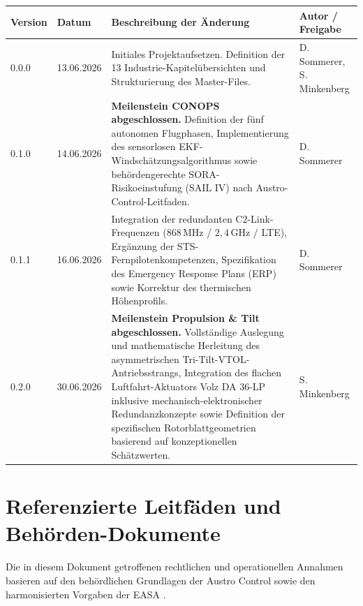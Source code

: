 \documentclass[12pt,a4paper,oneside]{report}
\begin{document}
\begin{table}[h!]
    \centering
    \small
    \begin{tabular}{p{1.8cm} p{2.2cm} p{7.5cm} p{3.0cm}}
        \toprule
        \textbf{Version} & \textbf{Datum} & \textbf{Beschreibung der Änderung} & \textbf{Autor / Freigabe} \\
        \midrule
        0.0.0 & 13.06.2026 & Initiales Projektaufsetzen. Definition der 13 Industrie-Kapitelübersichten und Strukturierung des Master-Files. & D. Sommerer, \newline S. Minkenberg \\
        \midrule
        0.1.0 & 14.06.2026 & \textbf{Meilenstein CONOPS abgeschlossen.} Definition der fünf autonomen Flugphasen, Implementierung des sensorlosen EKF-Windschätzungsalgorithmus sowie behördengerechte SORA-Risikoeinstufung (SAIL IV) nach Austro-Control-Leitfaden. & D. Sommerer \\
        \midrule
        0.1.1 & 16.06.2026 & Integration der redundanten C2-Link-Frequenzen ($868\,\text{MHz}$ / $2{,}4\,\text{GHz}$ / LTE), Ergänzung der STS-Fernpilotenkompetenzen, Spezifikation des Emergency Response Plans (ERP) sowie Korrektur des thermischen Höhenprofils. & D. Sommerer \\
        \midrule
       0.2.0 & 30.06.2026 & \textbf{Meilenstein Propulsion \& Tilt abgeschlossen.} Vollständige Auslegung und mathematische Herleitung des asymmetrischen Tri-Tilt-VTOL-Antriebsstrangs, Integration des flachen Luftfahrt-Aktuators Volz DA 36-LP inklusive mechanisch-elektronischer Redundanzkonzepte sowie Definition der spezifischen Rotorblattgeometrien basierend auf konzeptionellen Schätzwerten. & S. Minkenberg \\
        \bottomrule
        
    \end{tabular}
    \label{tab:revision_history}
\end{table}

\vspace{0.6cm}

\newpage
\section*{Referenzierte Leitfäden und Behörden-Dokumente}
Die in diesem Dokument getroffenen rechtlichen und operationellen Annahmen basieren auf den behördlichen Grundlagen der Austro Control \cite{austrocontrol_sora} sowie den harmonisierten Vorgaben der EASA \cite{easa_rules}.
\end{document}
